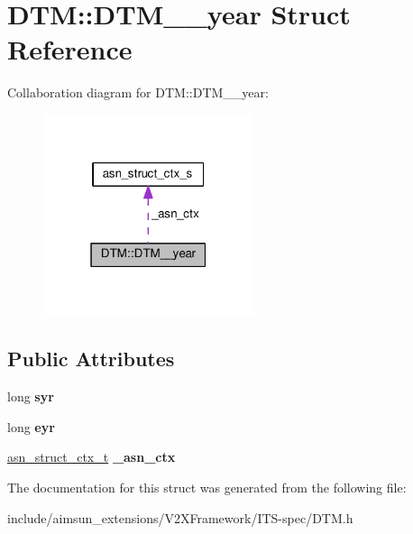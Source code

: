 \hypertarget{structDTM_1_1DTM____year}{}\section{D\+TM\+:\+:D\+T\+M\+\_\+\+\_\+year Struct Reference}
\label{structDTM_1_1DTM____year}


Collaboration diagram for D\+TM\+:\+:D\+T\+M\+\_\+\+\_\+year\+:\nopagebreak
\begin{figure}[H]
\begin{center}
\leavevmode
\includegraphics[width=175pt]{structDTM_1_1DTM____year__coll__graph}
\end{center}
\end{figure}
\subsection*{Public Attributes}
\begin{DoxyCompactItemize}
\item 
long {\bfseries syr}\hypertarget{structDTM_1_1DTM____year_a3cdf12759b8ef37492ea95deecabd358}{}\label{structDTM_1_1DTM____year_a3cdf12759b8ef37492ea95deecabd358}

\item 
long {\bfseries eyr}\hypertarget{structDTM_1_1DTM____year_a3a5f52bc3d7683793bf8c9ef95b4aecb}{}\label{structDTM_1_1DTM____year_a3a5f52bc3d7683793bf8c9ef95b4aecb}

\item 
\hyperlink{structasn__struct__ctx__s}{asn\+\_\+struct\+\_\+ctx\+\_\+t} {\bfseries \+\_\+asn\+\_\+ctx}\hypertarget{structDTM_1_1DTM____year_a0d1ea8d22629b51fe968450732594345}{}\label{structDTM_1_1DTM____year_a0d1ea8d22629b51fe968450732594345}

\end{DoxyCompactItemize}


The documentation for this struct was generated from the following file\+:\begin{DoxyCompactItemize}
\item 
include/aimsun\+\_\+extensions/\+V2\+X\+Framework/\+I\+T\+S-\/spec/D\+T\+M.\+h\end{DoxyCompactItemize}

